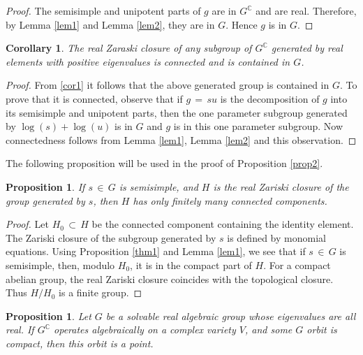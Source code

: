 \documentclass[12pt]{amsart}
\newtheorem{corollary}[theorem]{Corollary}
\newtheorem{proposition}[theorem]{Proposition}
\begin{document}
\begin{proof}
The semisimple and unipotent parts of $g$ are in $G^{\mathbb{C}}$ and are
real. Therefore, by Lemma \ref{lem1} and Lemma \ref{lem2}, they are in $G$.
Hence $g$ is in $G$.
\end{proof}

\begin{corollary}
\label{cor2} The real Zaraski closure of any subgroup of $G^{\mathbb{C}}$
generated by real elements with positive eigenvalues is connected and is
contained in $G$.
\end{corollary}

\begin{proof}
{}From \ref{cor1} it follows that the above generated group is contained in
$G$. To prove that it is connected, observe that if $g\,=\, su$ is the
decomposition of $g$ into its semisimple and unipotent parts, then the one
parameter subgroup generated by $\log(s) +\log(u)$ is in $G$ and $g$ is in
this one parameter subgroup. Now connectedness follows from Lemma
\ref{lem1}, Lemma \ref{lem2} and this observation.
\end{proof}

The following proposition will be used in the proof of Proposition
\ref{prop2}.

\begin{proposition}
\label{prop-a} If $s\, \in\, G$ is semisimple, and $H$ is the real Zariski
closure of the group generated by $s$, then $H$ has only finitely many
connected components.
\end{proposition}

\begin{proof}
Let $H_0\, \subset\, H$ be the connected component containing the identity
element. The Zariski closure of the subgroup generated by $s$ is defined by
monomial equations. Using Proposition \ref{thm1} and Lemma \ref{lem1}, we
see that if $s\, \in\, G$ is semisimple, then, modulo $H_0$, it is in the
compact part of $H$. For a compact abelian group, the real Zariski closure
coincides with the topological closure. Thus $H/H_0$ is a finite group.
\end{proof}

\begin{proposition}
\label{prop1} Let $G$ be a solvable real algebraic group whose eigenvalues
are all real. If $G^{\mathbb{C}}$ operates algebraically on a complex
variety $V$, and some $G$ orbit is compact, then this orbit is a point.
\end{proposition}
\end{document}
